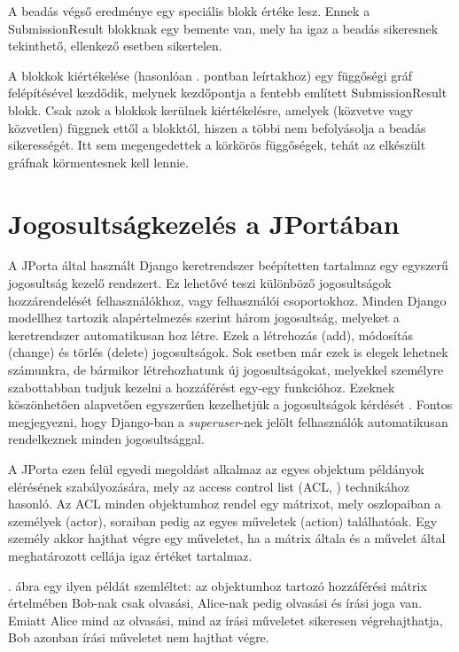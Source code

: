 A beadás végső eredménye egy speciális blokk értéke lesz. Ennek a SubmissionResult blokknak egy bemente van, mely ha igaz a beadás sikeresnek tekinthető, ellenkező esetben sikertelen.

A blokkok kiértékelése (hasonlóan . pontban leírtakhoz) egy függőségi gráf felépítésével kezdődik, melynek kezdőpontja a fentebb említett SubmissionResult blokk. Csak azok a blokkok kerülnek kiértékelésre, amelyek (közvetve vagy közvetlen) függnek ettől a blokktól, hiszen a többi nem befolyásolja a beadás sikerességét.  Itt sem megengedettek a körkörös függőségek, tehát az elkészült gráfnak körmentesnek kell lennie.

\section{Jogosultságkezelés a JPortában}\label{subsection:permissions}

A JPorta által használt Django keretrendszer beépítetten tartalmaz egy egyszerű jogosultság kezelő rendszert. Ez lehetővé teszi különböző jogosultságok hozzárendelését felhasználókhoz, vagy felhasználói csoportokhoz. Minden Django modellhez \cite{DjangoModel} tartozik alapértelmezés szerint három jogosultság, melyeket a keretrendszer automatikusan hoz létre. Ezek a létrehozás (add), módosítás (change) és törlés (delete) jogosultságok. Sok esetben már ezek is elegek lehetnek számunkra, de bármikor létrehozhatunk új jogosultságokat, melyekkel személyre szabottabban tudjuk kezelni a hozzáférést egy-egy funkcióhoz. Ezeknek köszönhetően alapvetően egyszerűen kezelhetjük a jogosultságok kérdését \cite{DjangoAuth}. Fontos megjegyezni, hogy Django-ban a \textit{superuser}-nek jelölt felhasználók automatikusan rendelkeznek minden jogosultsággal.

A JPorta ezen felül egyedi megoldást alkalmaz az egyes objektum példányok elérésének szabályozására, mely az access control list (ACL, \cite{ACL}) technikához hasonló. Az ACL minden objektumhoz rendel egy mátrixot, mely oszlopaiban a személyek (actor), soraiban pedig az egyes műveletek (action) találhatóak. Egy személy akkor hajthat végre egy műveletet, ha a mátrix általa és a művelet által meghatározott cellája igaz értéket tartalmaz.

. ábra egy ilyen példát szemléltet: az objektumhoz tartozó hozzáférési mátrix értelmében Bob-nak csak olvasási, Alice-nak pedig olvasási és írási joga van. Emiatt Alice mind az olvasási, mind az írási műveletet sikeresen végrehajthatja, Bob azonban írási műveletet nem hajthat végre.


